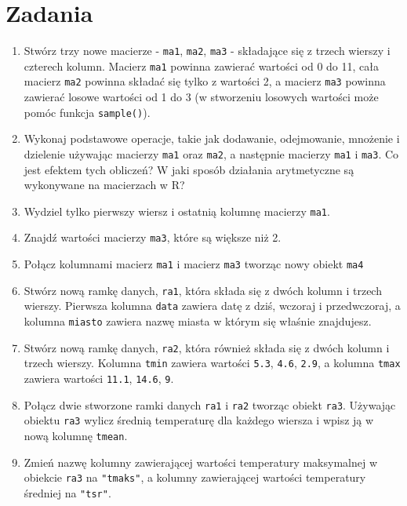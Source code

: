 \documentclass[paper=6in:9in,pagesize=pdftex,headinclude=on,footinclude=on,10pt]{scrbook}
\providecommand{\tightlist}{%
  \setlength{\itemsep}{0pt}\setlength{\parskip}{0pt}}
\begin{document}
\hypertarget{zadania}{%
\section{Zadania}\label{zadania}}

\begin{enumerate}
\def\labelenumi{\arabic{enumi})}
\tightlist
\item
  Stwórz trzy nowe macierze - \texttt{ma1}, \texttt{ma2}, \texttt{ma3} - składające się z trzech wierszy i czterech kolumn.
  Macierz \texttt{ma1} powinna zawierać wartości od 0 do 11, cała macierz \texttt{ma2} powinna składać się tylko z wartości 2, a macierz \texttt{ma3} powinna zawierać losowe wartości od 1 do 3 (w stworzeniu losowych wartości może pomóc funkcja \texttt{sample()}).
\item
  Wykonaj podstawowe operacje, takie jak dodawanie, odejmowanie, mnożenie i dzielenie używając macierzy \texttt{ma1} oraz \texttt{ma2}, a następnie macierzy \texttt{ma1} i \texttt{ma3}.
  Co jest efektem tych obliczeń?
  W jaki sposób działania arytmetyczne są wykonywane na macierzach w R?
\item
  Wydziel tylko pierwszy wiersz i ostatnią kolumnę macierzy \texttt{ma1}.
\item
  Znajdź wartości macierzy \texttt{ma3}, które są większe niż 2.
\item
  Połącz kolumnami macierz \texttt{ma1} i macierz \texttt{ma3} tworząc nowy obiekt \texttt{ma4}
\item
  Stwórz nową ramkę danych, \texttt{ra1}, która składa się z dwóch kolumn i trzech wierszy.
  Pierwsza kolumna \texttt{data} zawiera datę z dziś, wczoraj i przedwczoraj, a kolumna \texttt{miasto} zawiera nazwę miasta w którym się właśnie znajdujesz.
\item
  Stwórz nową ramkę danych, \texttt{ra2}, która również składa się z dwóch kolumn i trzech wierszy.
  Kolumna \texttt{tmin} zawiera wartości \texttt{5.3}, \texttt{4.6}, \texttt{2.9}, a kolumna \texttt{tmax} zawiera wartości \texttt{11.1}, \texttt{14.6}, \texttt{9}.
\item
  Połącz dwie stworzone ramki danych \texttt{ra1} i \texttt{ra2} tworząc obiekt \texttt{ra3}.
  Używając obiektu \texttt{ra3} wylicz średnią temperaturę dla każdego wiersza i wpisz ją w nową kolumnę \texttt{tmean}.
\item
  Zmień nazwę kolumny zawierającej wartości temperatury maksymalnej w obiekcie \texttt{ra3} na \texttt{"tmaks"}, a kolumny zawierającej wartości temperatury średniej na \texttt{"tsr"}.

\end{enumerate}
\end{document}
